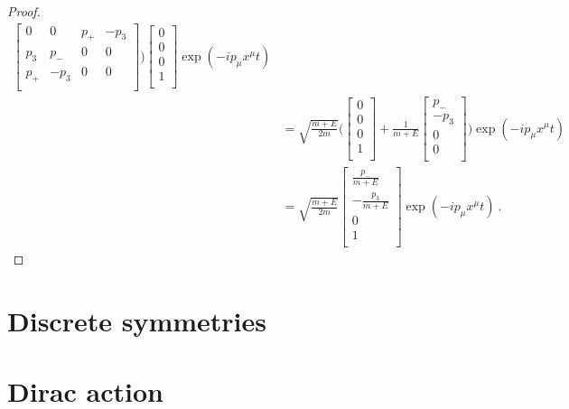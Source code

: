 \begin{proof}
\begin{equation*}
\begin{aligned}
\begin{bmatrix}
                0 & 0 & p_+ & - p_3 \\
                p_3 & p_- & 0 & 0 \\
                p_+ & -p_3 & 0 & 0 \\
            \end{bmatrix} \Big) \begin{bmatrix}
                0 \\ 0 \\ 0 \\ 1 \\
            \end{bmatrix} \exp(- i p_\mu x^\mu t) \\ & = \sqrt{\frac{m + E}{2m}} \Big ( \begin{bmatrix}
                0 \\ 0 \\ 0 \\ 1 \\
            \end{bmatrix} + \frac{1}{m + E} \begin{bmatrix}
                p_- \\ - p_3 \\ 0 \\ 0 \\
            \end{bmatrix} \Big) \exp(- i p_\mu x^\mu t) \\ & = \sqrt{\frac{m + E}{2m}} \begin{bmatrix}
                \frac{p_- }{m+E}\\ - \frac{p_3}{m+E} \\ 0 \\ 1 \\
            \end{bmatrix} \exp(-ip_\mu x^\mu t) ~.
        \end{aligned}
        \end{equation*}
    \end{proof}

\chapter{Discrete symmetries} 
\chapter{Dirac action} 